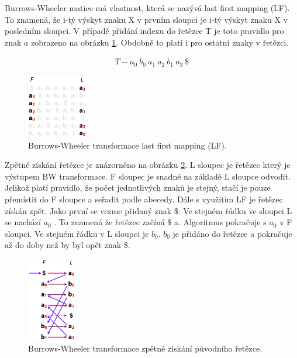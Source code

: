 \documentclass[czech,DP]{thesiskiv}
\numberwithin{equation}{section}
\begin{document}
\noindent
Burrows-Wheeler matice má vlastnost, která se nazývá last first mapping (LF). To znamená, že i-tý výskyt znaku X v prvním sloupci je i-tý výskyt znaku X v posledním sloupci. V případě přidání indexu do řetězce T je toto pravidlo pro znak $a$ zobrazeno na obrázku \ref{fig:bw_transform_lf}. Obdobně to platí i pro ostatní znaky v řetězci.

\begin{align}
   \label{rerezec_t} T - a_0 \: b_0 \: a_1 \: a_2 \: b_1 \: a_3 \: \$
\end{align}



\begin{figure}[H]		
		\centering
		\includegraphics[width=100px]{./img/BWT_2.png}
		\caption{Burrows-Wheeler transformace last first mapping (LF). \cite{bw_transform}}
		\label{fig:bw_transform_lf}
\end{figure}

\noindent
Zpětné získání řetězce je znázorněno na obrázku \ref{fig:bw_transform_inverse}. L sloupec je řetězec který je výstupem BW transformace. F sloupec je snadné na základě L sloupce odvodit. Jelikož platí pravidlo, že počet jednotlivých znaků je stejný, stačí je pouze přemístit do F sloupce a seřadit podle abecedy. Dále s využítím LF je řetězec získán zpět. Jako první se vezme přidaný znak \$. Ve stejném řádku ve sloupci L se nachází $a_0$ . To znamená že řetězec začíná \$ a. Algoritmus pokračuje s $a_0$ v F sloupci. Ve stejném řádku v L sloupci je $b_0$. $b_0$ je přidáno do řetězce a pokračuje až do doby než by byl opět znak \$. 


\begin{figure}[H]		
		\centering
		\includegraphics[width=80px]{./img/BWT_3.png}
		\caption{Burrows-Wheeler transformace zpětné získání původního řetězce. \cite{bw_transform}}
		\label{fig:bw_transform_inverse}
\end{figure}
\end{document}
